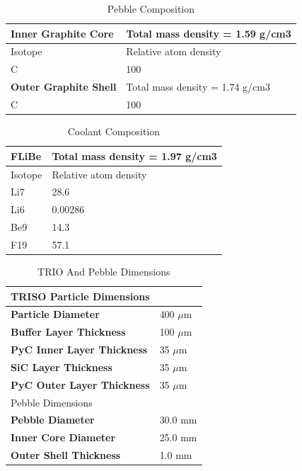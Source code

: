 \begin{table}
  \centering
  \begin{tabular}{|ll|}
    \hline \hline
    \textbf{Inner Graphite Core}	& Total mass density = 1.59 g/cm3 \\
    \hline
    Isotope	& Relative atom density \\
    C	& 100 \\
    \hline \hline
    \textbf{Outer Graphite Shell}	& Total mass density = 1.74 g/cm3 \\
    \hline
    C	& 100 \\
    \hline \hline
  \end{tabular}
  \caption{Pebble Composition}
  \label{tab:pebble_comp}
\end{table}


\begin{table}
  \centering
  \begin{tabular}{|ll|}
    \hline \hline
    \textbf{FLiBe}	      & Total mass density = 1.97 g/cm3 \\
    \hline
    Isotope	              & Relative atom density \\
    Li7	                  & 28.6 \\
    Li6	                  & 0.00286 \\
    Be9	                  & 14.3 \\
    F19	                  & 57.1 \\
    \hline \hline
  \end{tabular}
  \caption{Coolant Composition}
  \label{tab:coolant_comp}
\end{table}

\begin{table}
  \centering
  \begin{tabular}{|ll|}
    \hline \hline
    TRISO Particle Dimensions & \\
    \hline
    \textbf{Particle Diameter}	 & 400 $\mu$m \\
    \textbf{Buffer Layer Thickness} & 100 $\mu$m \\
    \textbf{PyC Inner Layer Thickness}	   & 35 $\mu$m \\
    \textbf{SiC Layer Thickness}	   & 35 $\mu$m \\
    \textbf{PyC Outer Layer Thickness}	     & 35 $\mu$m \\
    \hline \hline
    Pebble Dimensions & \\
    \hline
    \textbf{Pebble Diameter} & 30.0 mm \\
    \textbf{Inner Core Diameter} & 25.0 mm \\
    \textbf{Outer Shell Thickness} & 1.0 mm \\
    \hline \hline
  \end{tabular}
  \caption{TRIO And Pebble Dimensions}
  \label{tab:pebble_dims}
\end{table}

